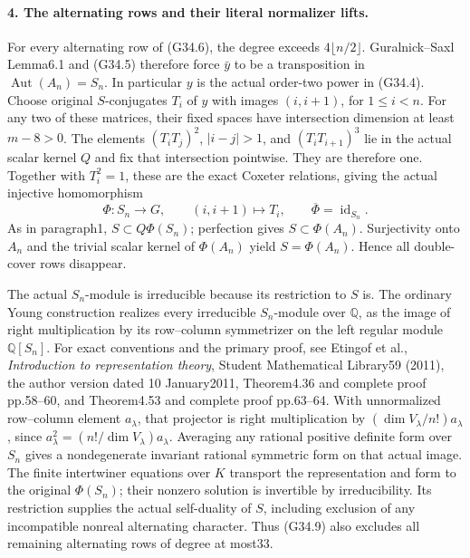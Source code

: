 \paragraph{4. The alternating rows and their literal normalizer lifts.}
For every alternating row of (G34.6), the degree exceeds
\(4\lfloor n/2\rfloor\). Guralnick--Saxl Lemma6.1 and
(G34.5) therefore force \(\bar y\) to be a transposition in
\(\operatorname{Aut}(A_n)=S_n\). In particular \(y\) is
the actual order-two power in (G34.4).
Choose original \(S\)-conjugates \(T_i\) of \(y\) with images
\((i,i+1)\), for \(1\le i<n\). For any two of these matrices,
their fixed spaces have intersection dimension at least
\(m-8>0\). The elements \((T_iT_j)^2\), \(|i-j|>1\),
and \((T_iT_{i+1})^3\) lie in the actual scalar kernel \(Q\)
and fix that intersection pointwise. They are therefore one.
Together with \(T_i^2=1\), these are the exact Coxeter relations,
giving the actual injective homomorphism
\[
 \Phi:S_n\longrightarrow G,
 \qquad (i,i+1)\longmapsto T_i,
 \qquad \overline\Phi=\operatorname{id}_{S_n}.             \tag{G34.10}
\]
As in paragraph1, \(S\subset Q\Phi(S_n)\); perfection gives
\(S\subset\Phi(A_n)\). Surjectivity onto \(A_n\) and the
trivial scalar kernel of \(\Phi(A_n)\) yield
\(S=\Phi(A_n)\). Hence all double-cover rows disappear.

The actual \(S_n\)-module is irreducible because its restriction
to \(S\) is. The ordinary Young construction realizes every
irreducible \(S_n\)-module over \(\mathbb Q\), as the image
of right multiplication by its row--column symmetrizer on the
left regular module \(\mathbb Q[S_n]\).
For exact conventions and the primary proof, see Etingof et al.,
\emph{Introduction to representation theory}, Student
Mathematical Library59 (2011), the author version dated
10 January2011, Theorem4.36 and complete proof pp.58--60,
and Theorem4.53 and complete proof pp.63--64. With unnormalized
row--column element \(a_\lambda\), that projector is right
multiplication by \((\dim V_\lambda/n!)a_\lambda\), since
\(a_\lambda^2=(n!/\dim V_\lambda)a_\lambda\).
Averaging any rational positive definite form over \(S_n\)
gives a nondegenerate invariant rational symmetric form on that
actual image. The finite intertwiner equations over \(K\)
transport the representation and form to the original \(\Phi(S_n)\);
their nonzero solution is invertible by irreducibility. Its
restriction supplies the actual self-duality of \(S\), including
exclusion of any incompatible nonreal alternating character.
Thus (G34.9) also excludes all remaining alternating rows of
degree at most33.

